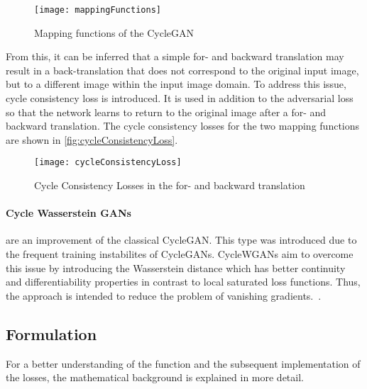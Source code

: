 \documentclass[fleqn,10pt]{SelfArx} %
\begin{document}
\begin{figure} \centering 
	\texttt{[image: mappingFunctions]}
	\caption{Mapping functions of the Cycle\ac{GAN}~\cite{image-to-image-ccan}}
	\label{fig:mappingFunctions}
\end{figure}

From this, it can be inferred that a simple for- and backward translation may result in a back-translation that does not correspond to the original input image, but to a different image within the input image domain. To address this issue, cycle consistency loss is introduced. It is used in addition to the adversarial loss so that the network learns to return to the original image after a for- and backward translation. The cycle consistency losses for the two mapping functions are shown in \autoref{fig:cycleConsistencyLoss}.~\cite{image-to-image-ccan}

\begin{figure*}[htb] \centering 
	\texttt{[image: cycleConsistencyLoss]}
	\caption{Cycle Consistency Losses in the for- and backward translation~\cite{image-to-image-ccan}}
	\label{fig:cycleConsistencyLoss}
\end{figure*}

\paragraph{Cycle Wasserstein \ac{GAN}s} are an improvement of the classical Cycle\ac{GAN}. This type was introduced due to the frequent training instabilites of Cycle\ac{GAN}s. CycleW\ac{GAN}s aim to overcome this issue by introducing the Wasserstein distance which has better continuity and differentiability properties in contrast to local saturated loss functions. Thus, the approach is intended to reduce the problem of vanishing gradients.~\cite{wgan-improvement}.

\subsection{Formulation}
For a better understanding of the function and the subsequent implementation of the losses, the mathematical background is explained in more detail.
\end{document}

